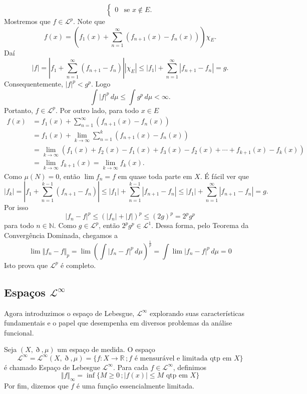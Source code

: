 \documentclass[a4paper, 11pt]{book}
\theoremstyle{definition}
\newcommand{\bN}{\mathbb{N}}
\newcommand{\bR}{\mathbb{R}}
\newcommand{\cL}{\mathcal{L}}
\begin{document}
\begin{prf}
\[\begin{cases}
            0 &\text{se } x \not\in E.
        \end{cases}
    \]
    Mostremos que $f \in \cL^p$.
    Note que
    \[
        f(x) = \left( f_1(x) + \sum_{n=1}^{\infty} (f_{n+1}(x) - f_n(x)) \right) \chi_E.
    \]
    Daí
    \[
        |f| = \left| f_1 + \sum_{n=1}^{\infty} (f_{n+1} - f_n) \right| |\chi_E| \leqslant |f_1| + \sum_{n=1}^{\infty}|f_{n+1} - f_n| = g.
    \]
    Consequentemente, $|f|^p < g^p$.
    Logo
    \[
        \int |f|^p \,d\mu \leqslant \int g^p \,d\mu < \infty.
    \]
    Portanto, $f \in \cL^p$.
    Por outro lado, para todo $x \in E$
    \[
        \begin{aligned}
            f(x) &= f_1(x) + \sum_{n=1}^{\infty} (f_{n+1}(x) - f_n(x))\\
            &= f_1(x) + \lim_{k\to \infty}\sum_{n=1}^{k} (f_{n+1}(x) - f_n(x))\\
            &= \lim_{k\to \infty} \left( f_1(x) + f_2(x) - f_1(x) + f_3(x) - f_2(x) + \cdots + f_{k+1}(x) - f_k(x)\right)\\[5pt]
            &= \lim_{k\to \infty} f_{k+1}(x) = \lim _{k\to \infty} f_{k}(x).
        \end{aligned}
    \]
    Como $\mu(N) = 0$, então $\lim f_n = f$ em quase toda parte em $X$.
    É fácil ver que
    \begin{equation}
        |f_k| = \left| f_1 + \sum_{n=1}^{k-1} (f_{n+1} - f_n) \right| \leqslant |f_1| + \sum_{n=1}^{k-1} |f_{n+1} - f_n| \leqslant |f_1| + \sum_{n=1}^{\infty} |f_{n+1} - f_n| = g.
    \end{equation}
    Por isso
    \[
        |f_n - f|^p \leqslant (|f_n| + |f|)^p \leqslant (2g)^p = 2^p g^p
    \]
    para todo $n \in \bN$.
    Como $g \in \cL^p$, então $2^p g^p \in \cL^1$.
    Dessa forma, pelo Teorema da Convergência Dominada, chegamos a
    \[
        \lim \Vert f_n - f \Vert_p = \lim \left( \int |f_n - f|^p \, d\mu \right)^\frac{1}{p} = \int \lim |f_n - f|^p \, d\mu = 0
    \]
    Isto prova que $\cL^p$ é completo.
\end{prf}

\subsection{Espaços $\cL^\infty$}

Agora introduzimos o espaço de Lebesgue, $\cL^\infty$ explorando suas características fundamentais e o papel que desempenha em diversos problemas da análise funcional.

\begin{dbox}
    Seja $(X,\eth,\mu)$ um espaço de medida. O espaço
    \[
        \cL^\infty = \cL^\infty(X,\eth,\mu) = \{f : X\to \bR \,; f \text{ é mensurável e limitada qtp em } X\}
    \]
    é chamado Espaço de Lebesgue $\cL^\infty$.
    Para cada $f \in \cL^\infty$, definimos
    \[
        \Vert f \Vert_\infty = \inf \{M \geqslant 0 \,; |f(x)| \leqslant M \text{ qtp em } X\}
    \]
    Por fim, dizemos que $f$ é uma função essencialmente limitada.
\end{dbox}
\end{document}
